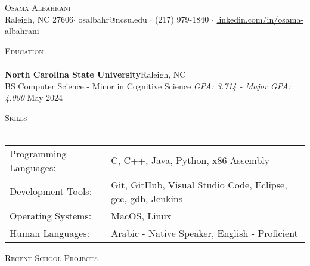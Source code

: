 \documentclass[a4paper]{article}
\newcommand{\lineunder} {
    \vspace*{-8pt} \\
    \hspace*{-18pt} \hrulefill \\
}
\newcommand{\header} [1] {
    {\hspace*{-18pt}\vspace*{6pt} \textsc{#1}}
    \vspace*{-6pt} \lineunder
}
\begin{document}
\vspace*{-40pt}

    

\vspace*{-10pt}
\begin{center}
	{\Huge \scshape {Osama Albahrani}}\\
	Raleigh, NC 27606$\cdot$ osalbahr@ncsu.edu $\cdot$ (217) 979-1840 $\cdot$ \href{https://linkedin.com/in/osama-albahrani/}{linkedin.com/in/osama-albahrani}\\
\end{center}

\header{Education}
\textbf{North Carolina State University}\hfill Raleigh, NC\\
BS Computer Science - Minor in Cognitive Science \textit{GPA: 3.714 - Major GPA: 4.000} \hfill May 2024\\
\vspace{2mm}

\header{Skills}
\begin{tabular}{ l l }
	Programming Languages:                      & C, C++, Java, Python, x86 Assembly                                  \\
	Development Tools:                      & Git, GitHub, Visual Studio Code, Eclipse, gcc, gdb, Jenkins                                   \\
	Operating Systems: & MacOS, Linux                   \\
	Human Languages:                                  & Arabic - Native Speaker, English - Proficient \\
\end{tabular}
\vspace{2mm}

\header{Recent School Projects}
\vspace{1mm}
\end{document}
